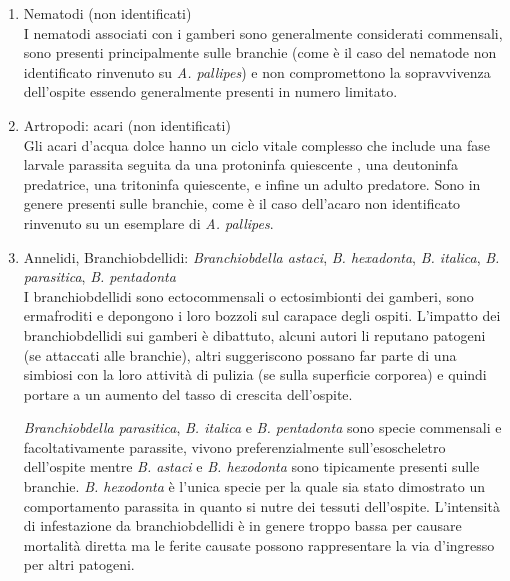 \documentclass[11pt,a4paper,italian,twoside,openany]{memoir}
\begin{document}
\begin{enumerate}[label={\alph*)}]
  \item Nematodi (non identificati)\\
  I nematodi associati con i gamberi sono generalmente considerati commensali, sono presenti principalmente sulle branchie (come è il caso del nematode non identificato rinvenuto su \emph{A. pallipes}) e non compromettono la sopravvivenza dell'ospite essendo generalmente presenti in numero limitato. 

  \item Artropodi: acari (non identificati) \\
  Gli acari d'acqua dolce hanno un ciclo vitale complesso che include una fase larvale parassita seguita da una protoninfa quiescente , una deutoninfa predatrice, una tritoninfa quiescente, e infine un adulto predatore. Sono in genere presenti sulle branchie, come è il caso dell'acaro non identificato rinvenuto su un esemplare di \emph{A. pallipes}.

  \item Annelidi, Branchiobdellidi: \emph{Branchiobdella astaci}, \emph{B. hexadonta}, \emph{B. italica}, \emph{B. parasitica}, \emph{B. pentadonta}\\
  I branchiobdellidi sono ectocommensali o ectosimbionti dei gamberi, sono ermafroditi e depongono i loro bozzoli sul carapace degli ospiti. L'impatto dei branchiobdellidi sui gamberi è dibattuto, alcuni autori li reputano patogeni (se attaccati alle branchie), altri suggeriscono possano far parte di una simbiosi con la loro attività di pulizia (se sulla superficie corporea) e quindi portare a un aumento del tasso di crescita dell'ospite.

  \emph{Branchiobdella parasitica}, \emph{B. italica} e \emph{B. pentadonta} sono specie commensali e facoltativamente parassite, vivono preferenzialmente sull'esoscheletro dell'ospite mentre \emph{B. astaci} e \emph{B. hexodonta} sono tipicamente presenti sulle branchie. \emph{B. hexodonta} è l'unica specie per la quale sia stato dimostrato un comportamento parassita in quanto si nutre dei tessuti dell'ospite. L'intensità di infestazione da branchiobdellidi è in genere troppo bassa per causare mortalità diretta ma le ferite causate possono rappresentare la via d'ingresso per altri patogeni. 
\end{enumerate}
\end{document}
